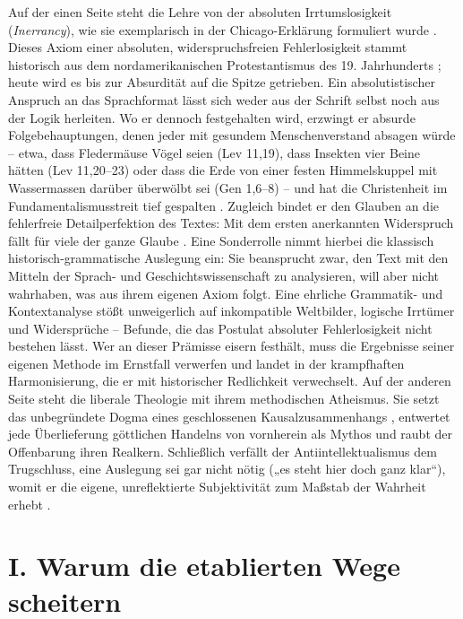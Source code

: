 \documentclass[11pt,a4paper]{article}
\begin{document}
Auf der einen Seite steht die Lehre von der absoluten Irrtumslosigkeit (\textit{Inerrancy}), wie sie exemplarisch in der Chicago-Erklärung formuliert wurde \citep{icbi1978}. Dieses Axiom einer absoluten, widerspruchsfreien Fehlerlosigkeit stammt historisch aus dem nordamerikanischen Protestantismus des 19. Jahrhunderts \citep{rogersmckim1979}; heute wird es bis zur Absurdität auf die Spitze getrieben. Ein absolutistischer Anspruch an das Sprachformat lässt sich weder aus der Schrift selbst noch aus der Logik herleiten. Wo er dennoch festgehalten wird, erzwingt er absurde Folgebehauptungen, denen jeder mit gesundem Menschenverstand absagen würde – etwa, dass Fledermäuse Vögel seien (Lev 11,19), dass Insekten vier Beine hätten (Lev 11,20–23) oder dass die Erde von einer festen Himmelskuppel mit Wassermassen darüber überwölbt sei (Gen 1,6–8) \citep{wells2013} – und hat die Christenheit im Fundamentalismusstreit tief gespalten \citep{marsden2006}. Zugleich bindet er den Glauben an die fehlerfreie Detailperfektion des Textes: Mit dem ersten anerkannten Widerspruch fällt für viele der ganze Glaube \citep{ehrman2009}. Eine Sonderrolle nimmt hierbei die klassisch historisch-grammatische Auslegung ein: Sie beansprucht zwar, den Text mit den Mitteln der Sprach- und Geschichtswissenschaft zu analysieren, will aber nicht wahrhaben, was aus ihrem eigenen Axiom folgt. Eine ehrliche Grammatik- und Kontextanalyse stößt unweigerlich auf inkompatible Weltbilder, logische Irrtümer und Widersprüche – Befunde, die das Postulat absoluter Fehlerlosigkeit nicht bestehen lässt. Wer an dieser Prämisse eisern festhält, muss die Ergebnisse seiner eigenen Methode im Ernstfall verwerfen und landet in der krampfhaften Harmonisierung, die er mit historischer Redlichkeit verwechselt. Auf der anderen Seite steht die liberale Theologie mit ihrem methodischen Atheismus. Sie setzt das unbegründete Dogma eines geschlossenen Kausalzusammenhangs \citep{troeltsch1913,schlatter1905}, entwertet jede Überlieferung göttlichen Handelns von vornherein als Mythos \citep{bultmann1941} und raubt der Offenbarung ihren Realkern. Schließlich verfällt der Antiintellektualismus dem Trugschluss, eine Auslegung sei gar nicht nötig („es steht hier doch ganz klar“), womit er die eigene, unreflektierte Subjektivität zum Maßstab der Wahrheit erhebt \citep{noll1994}.

\section*{I. Warum die etablierten Wege scheitern}
\end{document}
